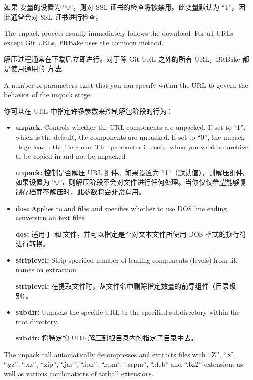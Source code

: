 如果  变量的设置为 ``0''，则对 SSL 证书的检查将被禁用。此变量默认为 ``1''，因此通常会对 SSL 证书进行检查。



The unpack process usually immediately follows the download. For all URLs except Git URLs, BitBake uses the common  method.

解压过程通常在下载后立即进行。对于除 Git URL 之外的所有 URL，BitBake 都是使用通用的  方法。

A number of parameters exist that you can specify within the URL to govern the behavior of the unpack stage:

你可以在 URL 中指定许多参数来控制解包阶段的行为：

\begin{itemize}
\setlength\itemsep{1.0em}
\item \textbf{unpack:} Controls whether the URL components are unpacked. If set to ``1'', which is the default, the components are unpacked. If set to ``0'', the unpack stage leaves the file alone. This parameter is useful when you want an archive to be copied in and not be unpacked.

\medskip
\textbf{unpack:} 控制是否解压 URL 组件。如果设置为 ``1''（默认值），则解压组件。如果设置为 ``0''，则解压阶段不会对文件进行任何处理。当你仅仅希望能够复制存档而不解压时，此参数将会非常有用。

\item \textbf{dos:} Applies to  and  files and specifies whether to use DOS line ending conversion on text files.

\medskip
\textbf{dos:} 适用于  和  文件，并可以指定是否对文本文件所使用 DOS 格式的换行符进行转换。

\item \textbf{striplevel:} Strip specified number of leading components (levels) from file names on extraction

\medskip
\textbf{striplevel:} 在提取文件时，从文件名中删除指定数量的前导组件（目录级别）。

\item \textbf{subdir:} Unpacks the specific URL to the specified subdirectory within the root directory.

\medskip
\textbf{subdir:} 将特定的 URL 解压到根目录内的指定子目录中去。
\end{itemize}

The unpack call automatically decompresses and extracts files with ``.Z'', ``.z'', ``.gz'', ``.xz'', ``.zip'', ``.jar'', ``.ipk'', ``.rpm''. ``.srpm'', ``.deb'' and ``.bz2'' extensions as well as various combinations of tarball extensions.


